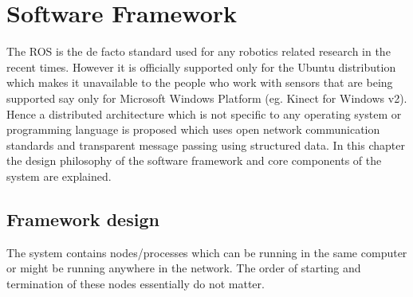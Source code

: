 
\chapter{Software Framework} %

\label{Chapter3} %

The ROS \cite{quigley2009ros} is the de facto standard used for any robotics related research in the recent times. However it is officially supported only for the Ubuntu distribution which makes it unavailable to the people who work with sensors that are being supported say only for Microsoft Windows Platform (eg. Kinect for Windows v2). Hence a distributed architecture which is not specific to any operating system or programming language is proposed which uses open network communication standards and transparent message passing using structured data. In this chapter the design philosophy of the software framework and core components of the system are explained.
\section{Framework design}		
The system contains nodes/processes which can be running in the same computer or might be running anywhere in the network. The order of starting and termination of these nodes essentially do not matter.
